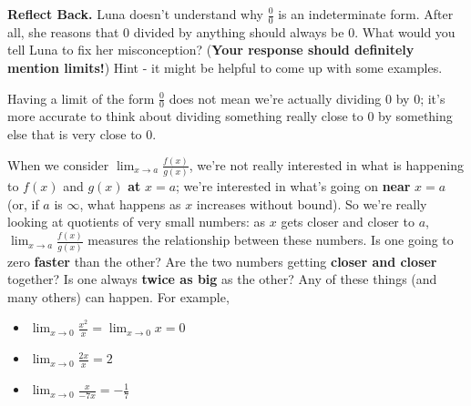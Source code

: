 \documentclass{article}
\begin{document}
\begin{enumerate}
\begin{problem}[\vfill]
    \textbf{Reflect Back.} Luna doesn't understand why $\frac{0}{0}$ is an
    indeterminate form. After all, she reasons that $0$ divided by anything should
    always be 0.  What would you tell Luna to fix her misconception? (\textbf{Your response should definitely mention limits!}) Hint - it might be helpful to come up with some examples.
  \end{problem}

  \begin{solution}
    Having a limit of the form $\frac{0}{0}$ does not mean we're actually
    dividing 0 by 0; it's more accurate to think about dividing something
    really close to 0 by something else that is very close to 0.

    When we consider $\displaystyle \lim_{x \to a} \frac{f(x)}{g(x)}$,
    we're not really interested in what is happening to $f(x)$ and $g(x)$
    {\bf at} $x=a$; we're interested in what's going on {\bf near} $x = a$
    (or, if $a$ is $\infty$, what happens as $x$ increases without bound).
    So we're really looking at quotients of very small numbers: as $x$
    gets closer and closer to $a$, $\displaystyle \lim_{x \to a}
    \frac{f(x)}{g(x)}$ measures the relationship between these numbers.
    Is one going to zero {\bf faster} than the other?  Are the two numbers
    getting {\bf closer and closer} together?  Is one always {\bf twice as
      big} as the other?  Any of these things (and many others) can
    happen.  For example,
    \begin{itemize}[nosep]
    \item $\displaystyle \lim_{x \to 0} \frac{x^2}{x} = \lim_{x \to 0} x =
      0$
    \item $\displaystyle \lim_{x \to 0} \frac{2x}{x} = 2$
    \item $\displaystyle \lim_{x \to 0} \frac{x}{-7x} = - \frac{1}{7}$
    \end{itemize}
  \end{solution}

\end{enumerate}



\end{document}
